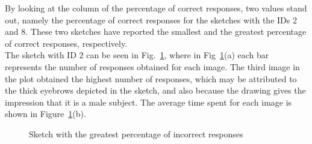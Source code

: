 %
By looking at the column of the percentage of correct responses, two values stand out, namely the percentage of correct responses for the sketches with the IDs \num{2} and \num{8}. These two sketches have reported the smallest and the greatest percentage of correct responses, respectively.\\ 
The sketch with ID \num{2} can be seen in Fig.~\ref{fig:result sketch with greatest numb of incorrect}, where in Fig~\ref{fig:result sketch with greatest numb of incorrect}(a) each bar represents the number of responses obtained for each image. The third image in the plot obtained the highest number of responses, which may be attributed to the thick eyebrows depicted in the sketch, and also because the drawing gives the impression that it is a male subject.
The average time spent for each image is shown in Figure~\ref{fig:result sketch with greatest numb of incorrect}(b).
\begin{figure}[!ht]
    \centering
     \quad
    \caption{Sketch with the greatest percentage of incorrect responses}
    \label{fig:result sketch with greatest numb of incorrect}
\end{figure}

